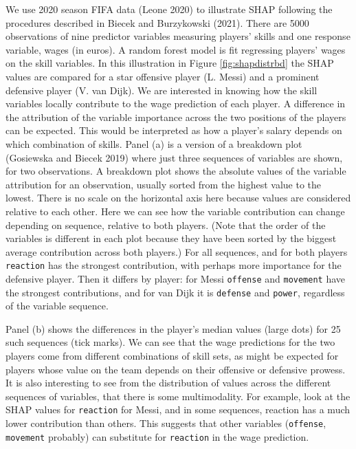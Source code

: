\documentclass[
]{article}
\begin{document}
We use 2020 season FIFA data (Leone 2020) to illustrate SHAP following the procedures described in Biecek and Burzykowski (2021). There are 5000 observations of nine predictor variables measuring players' skills and one response variable, wages (in euros). A random forest model is fit regressing players' wages on the skill variables. In this illustration in Figure \ref{fig:shapdistrbd} the SHAP values are compared for a star offensive player (L. Messi) and a prominent defensive player (V. van Dijk). We are interested in knowing how the skill variables locally contribute to the wage prediction of each player. A difference in the attribution of the variable importance across the two positions of the players can be expected. This would be interpreted as how a player's salary depends on which combination of skills. Panel (a) is a version of a breakdown plot (Gosiewska and Biecek 2019) where just three sequences of variables are shown, for two observations. A breakdown plot shows the absolute values of the variable attribution for an observation, usually sorted from the highest value to the lowest. There is no scale on the horizontal axis here because values are considered relative to each other. Here we can see how the variable contribution can change depending on sequence, relative to both players. (Note that the order of the variables is different in each plot because they have been sorted by the biggest average contribution across both players.) For all sequences, and for both players \texttt{reaction} has the strongest contribution, with perhaps more importance for the defensive player. Then it differs by player: for Messi \texttt{offense} and \texttt{movement} have the strongest contributions, and for van Dijk it is \texttt{defense} and \texttt{power}, regardless of the variable sequence.

Panel (b) shows the differences in the player's median values (large dots) for 25 such sequences (tick marks). We can see that the wage predictions for the two players come from different combinations of skill sets, as might be expected for players whose value on the team depends on their offensive or defensive prowess. It is also interesting to see from the distribution of values across the different sequences of variables, that there is some multimodality. For example, look at the SHAP values for \texttt{reaction} for Messi, and in some sequences, reaction has a much lower contribution than others. This suggests that other variables (\texttt{offense}, \texttt{movement} probably) can substitute for \texttt{reaction} in the wage prediction.
\end{document}
